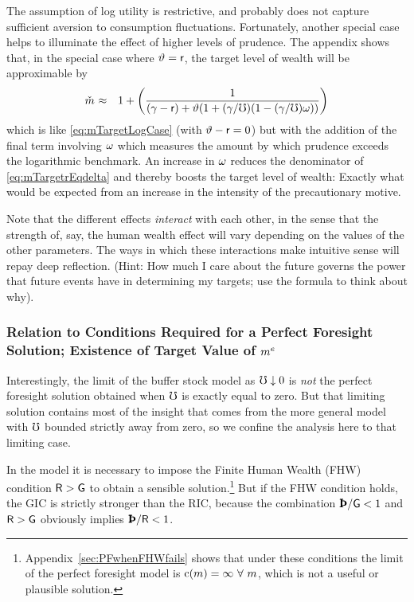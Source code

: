 \message{ !name(TractableBufferStock.tex)}\documentclass{handout}
\begin{document}
The assumption of log utility is restrictive, and probably does not capture
sufficient aversion to consumption fluctuations.  Fortunately, another special
case helps to illuminate the effect of higher levels of prudence.  The appendix shows that, in the special case where $\vartheta=\mathsf{r}$, the
target level of wealth will be approximable by
\begin{eqnarray}
 \mTarg^{\null} & \approx & 1 + \left(\frac{1}{(\pGro-\rfree)+\timeRate(1+(\pGro/\urate)(1-(\pGro/\urate)\prudEx))}\right) \label{eq:mTargetrEqdelta}
\end{eqnarray}
which is like \eqref{eq:mTargetLogCase} (with $\vartheta-\mathsf{r}=0$) but with the addition of the final term involving $\omega$ which measures the amount by which prudence exceeds the logarithmic benchmark.
An increase in $\omega$ reduces the denominator of \eqref{eq:mTargetrEqdelta}
and thereby boosts the target level of wealth: Exactly what would be expected from
an increase in the intensity of the precautionary motive.

Note that the different effects {\it interact} with each other, in the
sense that the strength of, say, the human wealth effect will vary
depending on the values of the other parameters.  The ways in which
these interactions make intuitive sense will repay deep reflection.
(Hint: How much I care about the future governs the power that future
events have in determining my targets; use the formula to think about why).

\subsubsection{Relation to Conditions Required for a Perfect Foresight Solution; Existence of Target Value of $m^{e}$}

Interestingly, the limit of the buffer stock model as $\mho \downarrow 0$ is {\it not} the perfect foresight solution obtained when $\mho$ is exactly equal to zero.  But that limiting solution contains most of the insight that comes from the more general model with $\mho$ bounded strictly away from zero, so we confine the analysis here to that limiting case. 

In the  model it is necessary to impose the Finite Human Wealth (FHW) condition $\mathsf{R} > \mathsf{G}$ to obtain a sensible solution.\footnote{Appendix~\ref{sec:PFwhenFHWfails} shows that under these conditions the limit of the perfect foresight model is $\mathrm{c}(m)=\infty~\forall~m$, which is not a useful or plausible solution.}  But if the FHW condition holds, the GIC is strictly stronger than the RIC, because the combination $\Pat/\WGro < 1$ and $\mathsf{R} > \mathsf{G}$ obviously implies $\Pat/\Rfree < 1$.  
\end{document}

